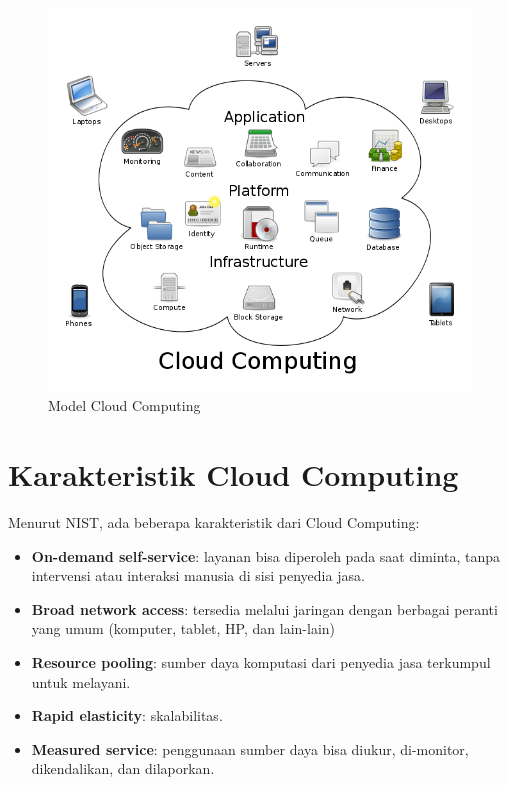   \begin{figure}[t]
    \begin{center}
      \includegraphics[scale=0.5]{images/662px-Cloud_computing.png}
    \end{center}
    \caption{Model Cloud Computing}
    \label{fig:ccsam}
  \end{figure}

\section{Karakteristik Cloud Computing}

Menurut NIST, ada beberapa karakteristik dari Cloud Computing:
\begin{itemize}
  \item \textbf{On-demand self-service}: layanan bisa diperoleh pada saat diminta, tanpa intervensi atau interaksi manusia di sisi penyedia jasa. 
  \item \textbf{Broad network access}: tersedia melalui jaringan dengan berbagai peranti yang umum (komputer, tablet, HP, dan lain-lain)
  \item \textbf{Resource pooling}: sumber daya komputasi dari penyedia jasa terkumpul untuk melayani.
  \item \textbf{Rapid elasticity}: skalabilitas.
  \item \textbf{Measured service}: penggunaan sumber daya bisa diukur, di-monitor, dikendalikan, dan dilaporkan.
\end{itemize}

